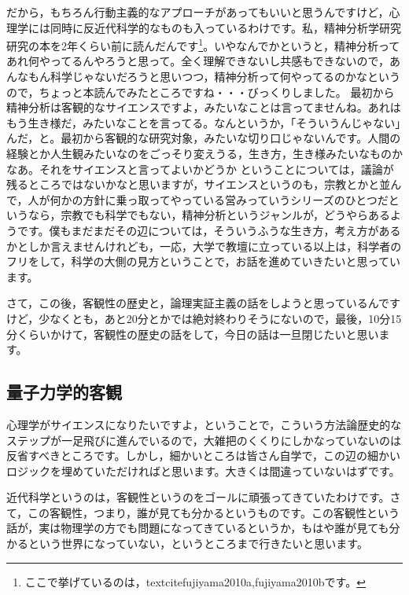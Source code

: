\documentclass{ltjsbook}
\begin{document}
だから，もちろん行動主義的なアプローチがあってもいいと思うんですけど，心理学には同時に反近代科学的なものも入っているわけです。私，精神分析学研究研究の本を2年くらい前に読んだんです\footnote{ここで挙げているのは，textcite{fujiyama2010a,fujiyama2010b}です。}。いやなんでかというと，精神分析ってあれ何やってるんやろうと思って。全く理解できないし共感もできないので，あんなもん科学じゃないだろうと思いつつ，精神分析って何やってるのかなというので，ちょっと本読んでみたところですね・・・びっくりしました。
最初から精神分析は客観的なサイエンスですよ，みたいなことは言ってませんね。あれはもう生き様だ，みたいなことを言ってる。なんというか，「そういうんじゃない」んだ，と。最初から客観的な研究対象，みたいな切り口じゃないんです。人間の経験とか人生観みたいなのをごっそり変えうる，生き方，生き様みたいなものかなあ。それをサイエンスと言ってよいかどうか ということについては，議論が残るところではないかなと思いますが，サイエンスというのも，宗教とかと並んで，人が何かの方針に乗っ取ってやっている営みっていうシリーズのひとつだというなら，宗教でも科学でもない，精神分析というジャンルが，どうやらあるようです。僕もまだまだその辺については，そういうふうな生き方，考え方があるかとしか言えませんけれども，一応，大学で教壇に立っている以上は，科学者のフリをして，科学の大側の見方ということで，お話を進めていきたいと思っています。

さて，この後，客観性の歴史と，論理実証主義の話をしようと思っているんですけど，少なくとも，あと20分とかでは絶対終わりそうにないので，最後，10分15分くらいかけて，客観性の歴史の話をして，今日の話は一旦閉じたいと思います。

\subsection{量子力学的客観}

心理学がサイエンスになりたいですよ，ということで，こういう方法論歴史的なステップが一足飛びに進んでいるので，大雑把のくくりにしかなっていないのは反省すべきところです。しかし，細かいところは皆さん自学で，この辺の細かいロジックを埋めていただければと思います。大きくは間違っていないはずです。

近代科学というのは，客観性というのをゴールに頑張ってきていたわけです。さて，この客観性，つまり，誰が見ても分かるというものです。この客観性という話が，実は物理学の方でも問題になってきているというか，もはや誰が見ても分かるという世界になっていない，というところまで行きたいと思います。
\end{document}
